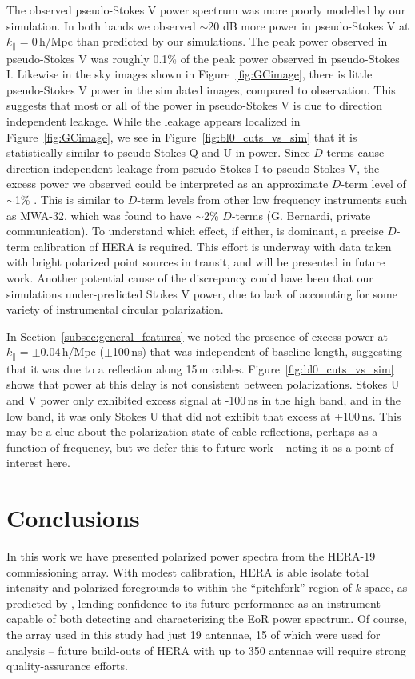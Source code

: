 \documentclass[twocolumn, trackchanges]{aastex61}
\newcommand{\edited}[1]{{\bf \color{red} #1}}
\begin{document}
{The observed pseudo-Stokes V power spectrum was more poorly modelled by our simulation. In both bands we observed $\sim$20 dB more power in pseudo-Stokes V at $k_{\parallel}=0$\,h/Mpc than predicted by our simulations. The peak power observed in pseudo-Stokes V was roughly 0.1\% of the peak power observed in pseudo-Stokes I. Likewise in the sky images shown in Figure~\ref{fig:GCimage}, there is little pseudo-Stokes V power in the simulated images, compared to observation. This suggests that most or all of the power in pseudo-Stokes V is due to direction independent leakage. While the leakage appears localized in Figure~\ref{fig:GCimage}, we see in Figure~\ref{fig:bl0_cuts_vs_sim} that it is statistically similar to pseudo-Stokes Q and U in power.
Since $D$-terms cause direction-independent leakage from pseudo-Stokes I to pseudo-Stokes V, the excess power we observed could be interpreted as an approximate $D$-term level of $\sim$1\% \citep{TMS}. This is similar to $D$-term levels from other low frequency instruments such as MWA-32, which was found to have $\sim$2\% $D$-terms (G. Bernardi, private communication).
To understand which effect, if either, is dominant, a precise $D$-term calibration of HERA is required. This effort is underway with data taken with bright polarized point sources in transit, and will be presented in future work. Another potential cause of the discrepancy could have been that our simulations under-predicted Stokes V power, due to lack of accounting for some variety of instrumental circular polarization.

In Section~\ref{subsec:general_features} we noted the presence of excess power at $k_{\parallel}=\pm 0.04$\,h/Mpc ($\pm$100\,ns) that was independent of baseline length, suggesting that it was due to a reflection along 15\,m cables. Figure~\ref{fig:bl0_cuts_vs_sim} shows that power at this delay is not consistent between polarizations. Stokes U and V power only exhibited excess signal at -100\,ns in the high band, and in the low band, it was only Stokes U that did not exhibit that excess at +100\,ns. This may be a clue about the polarization state of cable reflections, perhaps as a function of frequency, but we defer this to future work -- noting it as a point of interest here.

\edited{\section{Conclusions}}
\label{conc}

In this work we have presented polarized power spectra from the HERA-19 commissioning array. With modest calibration, HERA is able isolate total intensity and polarized foregrounds to within the ``pitchfork'' region of \textit{k}-space, as predicted by \cite{Nithya.15b}, lending confidence to its future performance as an instrument capable of both detecting and characterizing the EoR power spectrum. Of course, the array used in this study had just 19 antennae, 15 of which were used for analysis -- future build-outs of HERA with up to 350 antennae will require strong quality-assurance efforts. %

}
\end{document}
